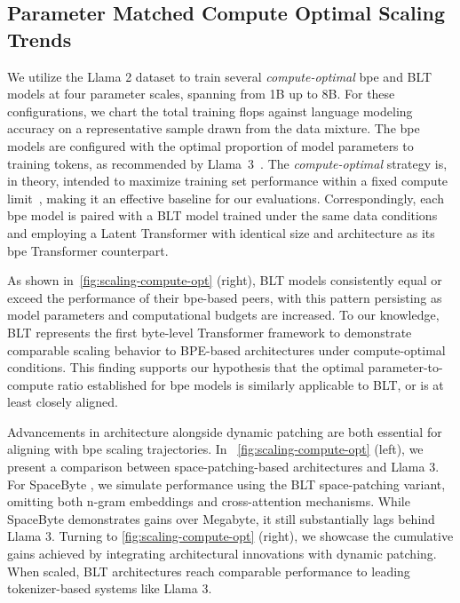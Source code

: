\subsection{Parameter Matched Compute Optimal Scaling Trends}
\label{section:parameter-matched-scaling}
We utilize the Llama 2 dataset to train several \textit{compute-optimal} bpe and {\textsc BLT} models at four parameter scales, spanning from 1B up to 8B. For these configurations, we chart the total training flops against language modeling accuracy on a representative sample drawn from the data mixture. The bpe models are configured with the optimal proportion of model parameters to training tokens, as recommended by Llama~3~\citep{dubey2024llama}. The \textit{compute-optimal} strategy is, in theory, intended to maximize training set performance within a fixed compute limit~\citep{hoffmann2022training}, making it an effective baseline for our evaluations. Correspondingly, each bpe model is paired with a {\textsc BLT} model trained under the same data conditions and employing a Latent Transformer with identical size and architecture as its bpe Transformer counterpart.

As shown in~\autoref{fig:scaling-compute-opt} (right), {\textsc BLT} models consistently equal or exceed the performance of their bpe-based peers, with this pattern persisting as model parameters and computational budgets are increased. To our knowledge, {\textsc BLT} represents the first byte-level Transformer framework to demonstrate comparable scaling behavior to BPE-based architectures under compute-optimal conditions. This finding supports our hypothesis that the optimal parameter-to-compute ratio established for bpe models is similarly applicable to {\textsc BLT}, or is at least closely aligned.

Advancements in architecture alongside dynamic patching are both essential for aligning with bpe scaling trajectories. In ~\autoref{fig:scaling-compute-opt} (left), we present a comparison between space-patching-based architectures and Llama 3. For SpaceByte \citep{slagle2024spacebyte}, we simulate performance using the {\textsc BLT} space-patching variant, omitting both n-gram embeddings and cross-attention mechanisms. While SpaceByte demonstrates gains over Megabyte, it still substantially lags behind Llama 3. Turning to \autoref{fig:scaling-compute-opt} (right), we showcase the cumulative gains achieved by integrating architectural innovations with dynamic patching. When scaled, {\textsc BLT} architectures reach comparable performance to leading tokenizer-based systems like Llama 3.

